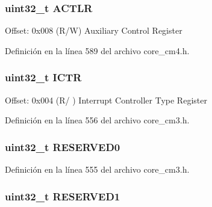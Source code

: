\subsubsection[{\texorpdfstring{A\+C\+T\+LR}{ACTLR}}]{ uint32\+\_\+t A\+C\+T\+LR}\hypertarget{struct_s_cn_s_c_b___type_a9a73f00a0223775caeb09c5c6abb3087}{}\label{struct_s_cn_s_c_b___type_a9a73f00a0223775caeb09c5c6abb3087}
Offset\+: 0x008 (R/W) Auxiliary Control Register 

Definición en la línea 589 del archivo core\+\_\+cm4.\+h.

\subsubsection[{\texorpdfstring{I\+C\+TR}{ICTR}}]{ uint32\+\_\+t I\+C\+TR}\hypertarget{struct_s_cn_s_c_b___type_a5bb2c6795b90f12077534825cc844b56}{}\label{struct_s_cn_s_c_b___type_a5bb2c6795b90f12077534825cc844b56}
Offset\+: 0x004 (R/ ) Interrupt Controller Type Register 

Definición en la línea 556 del archivo core\+\_\+cm3.\+h.

\subsubsection[{\texorpdfstring{R\+E\+S\+E\+R\+V\+E\+D0}{RESERVED0}}]{\setlength{\rightskip}{0pt plus 5cm}uint32\+\_\+t R\+E\+S\+E\+R\+V\+E\+D0}\hypertarget{struct_s_cn_s_c_b___type_a3bc109a372d05329e22cb7e3bf2b84ba}{}\label{struct_s_cn_s_c_b___type_a3bc109a372d05329e22cb7e3bf2b84ba}


Definición en la línea 555 del archivo core\+\_\+cm3.\+h.

\subsubsection[{\texorpdfstring{R\+E\+S\+E\+R\+V\+E\+D1}{RESERVED1}}]{\setlength{\rightskip}{0pt plus 5cm}uint32\+\_\+t R\+E\+S\+E\+R\+V\+E\+D1}\hypertarget{struct_s_cn_s_c_b___type_a9b85a62ba1c4cf0e4ca2b1ff8e5bc85c}{}\label{struct_s_cn_s_c_b___type_a9b85a62ba1c4cf0e4ca2b1ff8e5bc85c}


